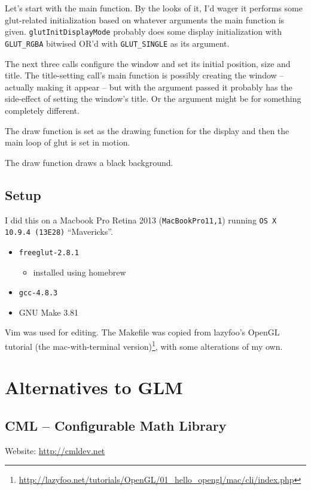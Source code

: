 \section{} %
Let's start with the main function.
By the looks of it, I'd wager it performs some glut-related initialization based on whatever arguments the main function is given.
\texttt{glutInitDisplayMode} probably does some display initialization with \texttt{GLUT\_RGBA} bitwised OR'd with \texttt{GLUT\_SINGLE} as its argument.

The next three calls configure the window and set its initial position, size and title.
The title-setting call's main function is possibly creating the window -- actually making it appear -- but with the argument passed it probably has the side-effect of setting the window's title.
Or the argument might be for something completely different.

The draw function is set as the drawing function for the display and then the main loop of glut is set in motion.

The draw function draws a black background.

\subsection{Setup}
I did this on a Macbook Pro Retina 2013 (\texttt{MacBookPro11,1}) running \texttt{OS X 10.9.4 (13E28)} ``Mavericks''.
\begin{itemize}
    \item \texttt{freeglut-2.8.1}
        \begin{itemize}
            \item installed using homebrew
        \end{itemize}
    \item \texttt{gcc-4.8.3}
    \item GNU Make 3.81
\end{itemize}

Vim was used for editing.
The Makefile was copied from lazyfoo's OpenGL tutorial (the mac-with-terminal version)\footnote{\url{http://lazyfoo.net/tutorials/OpenGL/01_hello_opengl/mac/cli/index.php}}, with some alterations of my own.

\section{Alternatives to GLM} %

\subsection{CML -- Configurable Math Library}
Website: \url{http://cmldev.net}

